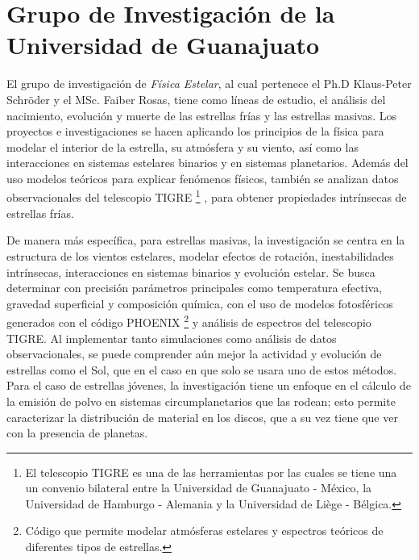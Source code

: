 \documentclass[11pt]{article}
\begin{document}
\section{Grupo de Investigación de la Universidad de Guanajuato}

El grupo de investigación de \textit{Física Estelar}, al cual pertenece el Ph.D Klaus-Peter Schröder y el MSc. Faiber Rosas, tiene como líneas de estudio, el análisis del nacimiento, evolución y muerte de las estrellas frías y las estrellas masivas.  Los proyectos e investigaciones se hacen aplicando los principios de la física para modelar el interior de la estrella, su atmósfera y su viento, así como las interacciones en sistemas estelares binarios y en sistemas planetarios. Además del uso modelos teóricos para explicar fenómenos físicos, también se analizan datos observacionales del telescopio TIGRE  \footnote{El telescopio TIGRE es una de las herramientas por las cuales se tiene una un convenio bilateral entre la Universidad de Guanajuato - México, la Universidad de Hamburgo - Alemania y la Universidad de Liège - Bélgica.} \cite{schmitt2014tigre}, para obtener propiedades intrínsecas de estrellas frías.

\noindent De manera más específica, para estrellas masivas, la investigación se centra en la estructura de los vientos estelares, modelar efectos de rotación,  inestabilidades intrínsecas, interacciones en sistemas binarios y evolución estelar. Se busca determinar con precisión parámetros principales como temperatura efectiva, gravedad superficial y composición química, con el uso de modelos fotosféricos generados con el código PHOENIX  \footnote{Código que permite modelar atmósferas estelares y espectros teóricos de diferentes tipos de estrellas.} \cite{hauschildt2005cool} y análisis de espectros del telescopio TIGRE. Al implementar tanto simulaciones como análisis de datos observacionales, se puede comprender aún mejor la actividad y evolución de estrellas como el Sol, que en el caso en que solo se usara uno de estos métodos. Para el caso de estrellas jóvenes, la investigación tiene un enfoque en el cálculo de la emisión de polvo en sistemas circumplanetarios que las rodean; esto permite caracterizar la distribución de material en los discos, que a su vez tiene que ver con la presencia de planetas. 
\end{document}
